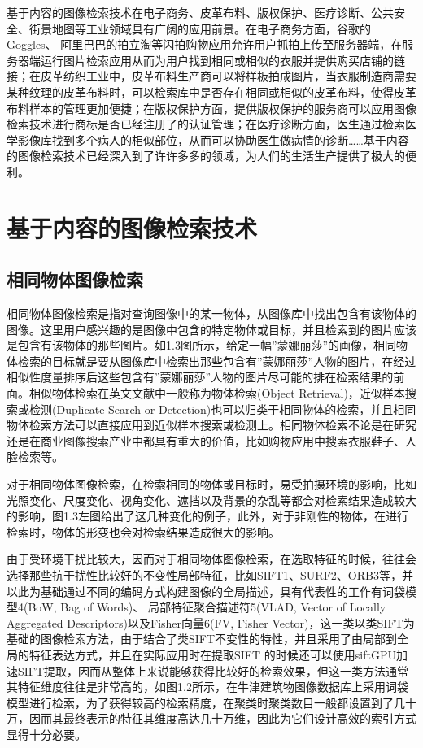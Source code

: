 \documentclass[color=cyan,mathpazo,titlestyle=hang]{elegantbook}
\begin{document}
基于内容的图像检索技术在电子商务、皮革布料、版权保护、医疗诊断、公共安全、街景地图等工业领域具有广阔的应用前景。在电子商务方面，谷歌的Goggles、 阿里巴巴的拍立淘等闪拍购物应用允许用户抓拍上传至服务器端，在服务器端运行图片检索应用从而为用户找到相同或相似的衣服并提供购买店铺的链接；在皮革纺织工业中，皮革布料生产商可以将样板拍成图片，当衣服制造商需要某种纹理的皮革布料时，可以检索库中是否存在相同或相似的皮革布料，使得皮革布料样本的管理更加便捷；在版权保护方面，提供版权保护的服务商可以应用图像检索技术进行商标是否已经注册了的认证管理；在医疗诊断方面，医生通过检索医学影像库找到多个病人的相似部位，从而可以协助医生做病情的诊断……基于内容的图像检索技术已经深入到了许许多多的领域，为人们的生活生产提供了极大的便利。

\section{基于内容的图像检索技术}

\subsection{相同物体图像检索}

相同物体图像检索是指对查询图像中的某一物体，从图像库中找出包含有该物体的图像。这里用户感兴趣的是图像中包含的特定物体或目标，并且检索到的图片应该是包含有该物体的那些图片。如1.3图所示，给定一幅”蒙娜丽莎”的画像，相同物体检索的目标就是要从图像库中检索出那些包含有”蒙娜丽莎”人物的图片，在经过相似性度量排序后这些包含有”蒙娜丽莎”人物的图片尽可能的排在检索结果的前面。相似物体检索在英文文献中一般称为物体检索(Object Retrieval)，近似样本搜索或检测(Duplicate Search or Detection)也可以归类于相同物体的检索，并且相同物体检索方法可以直接应用到近似样本搜索或检测上。相同物体检索不论是在研究还是在商业图像搜索产业中都具有重大的价值，比如购物应用中搜索衣服鞋子、人脸检索等。

对于相同物体图像检索，在检索相同的物体或目标时，易受拍摄环境的影响，比如光照变化、尺度变化、视角变化、遮挡以及背景的杂乱等都会对检索结果造成较大的影响，图1.3左图给出了这几种变化的例子，此外，对于非刚性的物体，在进行检索时，物体的形变也会对检索结果造成很大的影响。

由于受环境干扰比较大，因而对于相同物体图像检索，在选取特征的时候，往往会选择那些抗干扰性比较好的不变性局部特征，比如SIFT1、SURF2、ORB3等，并以此为基础通过不同的编码方式构建图像的全局描述，具有代表性的工作有词袋模型4(BoW, Bag of Words)、 局部特征聚合描述符5(VLAD, Vector of Locally Aggregated Descriptors)以及Fisher向量6(FV, Fisher Vector)，这一类以类SIFT为基础的图像检索方法，由于结合了类SIFT不变性的特性，并且采用了由局部到全局的特征表达方式，并且在实际应用时在提取SIFT 的时候还可以使用siftGPU加速SIFT提取，因而从整体上来说能够获得比较好的检索效果，但这一类方法通常其特征维度往往是非常高的，如图1.2所示，在牛津建筑物图像数据库上采用词袋模型进行检索，为了获得较高的检索精度，在聚类时聚类数目一般都设置到了几十万，因而其最终表示的特征其维度高达几十万维，因此为它们设计高效的索引方式显得十分必要。
\end{document}
